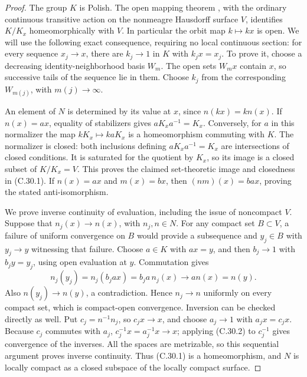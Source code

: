 \begin{proof}
The group $K$ is Polish. The open mapping theorem
\cite[Theorem~3.5]{C_GomezPinedoUzcategui2017}, with the ordinary
continuous transitive action on the nonmeagre Hausdorff surface $V$,
identifies $K/K_x$ homeomorphically with $V$. In particular the
orbit map $k\mapsto kx$ is open. We will use the following exact
consequence, requiring no local continuous section: for every
sequence $x_j\to x$, there are $k_j\to1$ in $K$ with $k_jx=x_j$.
To prove it, choose a decreasing identity-neighborhood basis $W_m$.
The open sets $W_mx$ contain $x$, so successive tails of the sequence
lie in them. Choose $k_j$ from the corresponding $W_{m(j)}$, with
$m(j)\to\infty$.

An element of $N$ is determined by its value at $x$, since
$n(kx)=kn(x)$. If $n(x)=ax$, equality of stabilizers gives
$aK_xa^{-1}=K_x$. Conversely, for $a$ in this normalizer the map
$kK_x\mapsto kaK_x$ is a homeomorphism commuting with $K$.
The normalizer is closed: both inclusions defining
$aK_xa^{-1}=K_x$ are intersections of closed conditions.
It is saturated for the quotient by $K_x$, so its image is a closed
subset of $K/K_x=V$. This proves the claimed set-theoretic image
and closedness in (C.30.1). If $n(x)=ax$ and $m(x)=bx$, then
$(nm)(x)=bax$, proving the stated anti-isomorphism.

We prove inverse continuity of evaluation, including the issue of
noncompact $V$. Suppose that $n_j(x)\to n(x)$, with $n_j,n\in N$.
For any compact set $B\subset V$, a failure of uniform convergence
on $B$ would provide a subsequence and $y_j\in B$ with
$y_j\to y$ witnessing that failure. Choose $a\in K$ with $ax=y$,
and then $b_j\to1$ with $b_jy=y_j$, using open evaluation at $y$.
Commutation gives
\[
 n_j(y_j)=n_j(b_jax)=b_ja\,n_j(x)\longrightarrow a n(x)=n(y).
                                                               \tag{C.30.2}
\]
Also $n(y_j)\to n(y)$, a contradiction. Hence $n_j\to n$ uniformly
on every compact set, which is compact-open convergence.
Inversion can be checked directly as well. Put $c_j=n^{-1}n_j$,
so $c_jx\to x$, and choose $a_j\to1$ with $a_jx=c_jx$.
Because $c_j$ commutes with $a_j$,
$c_j^{-1}x=a_j^{-1}x\to x$; applying (C.30.2) to $c_j^{-1}$
gives convergence of the inverses. All the spaces are metrizable,
so this sequential argument proves inverse continuity.
Thus (C.30.1) is a homeomorphism, and $N$ is locally compact as a
closed subspace of the locally compact surface.


\end{proof}

